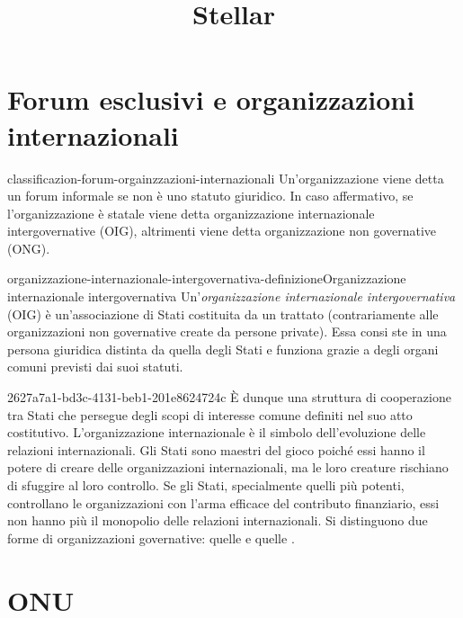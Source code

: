 \documentclass[preview]{standalone}
\begin{document}
\title{Stellar}
\genpage

\section{Forum esclusivi e organizzazioni internazionali}

\begin{snippet}{classificazion-forum-orgainzzazioni-internazionali}
    Un'organizzazione viene detta un forum informale se non è uno statuto giuridico.
    In caso affermativo, se l'organizzazione è statale viene detta
    organizzazione internazionale intergovernative (OIG), altrimenti viene detta
    organizzazione non governative (ONG).
\end{snippet}

\begin{snippetdefinition}{organizzazione-internazionale-intergovernativa-definizione}{Organizzazione internazionale intergovernativa}
    Un'\textit{organizzazione internazionale intergovernativa} (OIG) è un'associazione di Stati costituita da un
    trattato (contrariamente alle organizzazioni non governative create da persone private).
    Essa consi ste in una persona giuridica distinta da quella degli Stati e funziona grazie a degli organi comuni
    previsti dai suoi statuti.
\end{snippetdefinition}

\begin{snippet}{2627a7a1-bd3c-4131-beb1-201e8624724c}
    È dunque una struttura di cooperazione tra Stati che persegue degli scopi di
    interesse comune definiti nel suo atto costitutivo.
    L'organizzazione internazionale è il simbolo dell'evoluzione delle relazioni internazionali. Gli Stati
    sono maestri del gioco poiché essi hanno il potere di creare delle organizzazioni internazionali, ma
    le loro creature rischiano di sfuggire al loro controllo. Se gli Stati, specialmente quelli più potenti,
    controllano le organizzazioni con l'arma efficace del contributo finanziario, essi non hanno più il monopolio delle relazioni internazionali.
    Si distinguono due forme di organizzazioni governative: quelle  e quelle .
\end{snippet}


\section{ONU}
\end{document}
